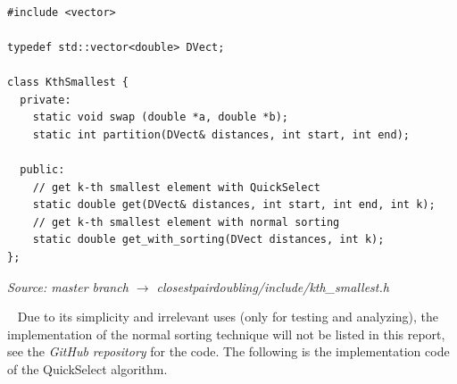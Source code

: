 \documentclass[12pt,english,]{article}
\begin{document}
~

\newpage

\begin{lstlisting}
#include <vector>

typedef std::vector<double> DVect;

class KthSmallest {
  private:
    static void swap (double *a, double *b);
    static int partition(DVect& distances, int start, int end);

  public:
    // get k-th smallest element with QuickSelect
    static double get(DVect& distances, int start, int end, int k);
    // get k-th smallest element with normal sorting 
    static double get_with_sorting(DVect distances, int k);
};
\end{lstlisting}
\vspace{-9truemm}
\begin{minipage}{1\textwidth}
  \begin{flushright}
  {\footnotesize \emph{Source: master branch $\rightarrow$ closestpairdoubling/include/kth\_smallest.h}\par}
  \end{flushright}
\end{minipage}
\vspace{0.5truemm}

~ Due to its simplicity and irrelevant uses (only for testing and
analyzing), the implementation of the normal sorting technique will not
be listed in this report, see the \emph{GitHub repository} for the code.
The following is the implementation code of the QuickSelect algorithm.

~
\end{document}
